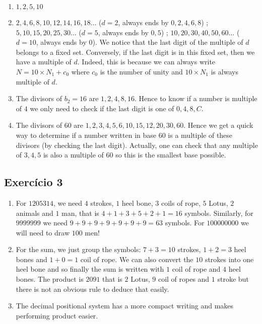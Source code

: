 \begin{enumerate}
\item $1,2,5,10$
\item $2,4,6,8,10,12,14,16,18\ldots$ ($d=2$, always ends by $0,2,4,6,8$) ;
  $5,10,15,20,25,30\ldots$ ($d=5$, always ends by $0,5$) ;
  $10,20,30,40,50,60\ldots$ ($d=10$, always ends by $0$).
  We notice that the last digit of the multiple of $d$ belongs to a fixed set.
  Conversely, if the last digit is in this fixed set, then we have a multiple
  of $d$. Indeed, this is because we can always write
  $N = 10 \times N_1 + c_0$ where $c_0$ is the number of unity and
  $10 \times N_1$ is always multiple of $d$.

\item The divisors of $b_2=16$ are $1,2,4,8,16$. Hence
  to know if a number is multiple of $4$ we only need to check if the
  last digit is one of $0,4,8,C$.
\item The divisors of $60$ are $1,2,3,4,5,6,10,15,12,20,30,60$.
  Hence we get a quick way to determine if a number written in base $60$ is a
  multiple of these divisors (by checking the last digit). Actually, one can
  check that any multiple of $3,4,5$ is also a multiple of $60$ so this is the
  smallest base possible.
\end{enumerate}

\subsection*{Exercício 3}

\begin{enumerate}
\item For $1205314$, we need
  $4$ strokes, $1$ heel bone, $3$ coils of rope, $5$ Lotus,
  $2$ animals and $1$ man, that is $4+1+3+5+2+1=16$ symbols.
  Similarly, for $9999999$ we need $9+9+9+9+9+9+9=63$ symbols.
  For $100000000$ we will need to draw $100$ men!
\item For the sum, we just group the symbols:
  $7+3=10$ strokes, $1+2=3$ heel bones and $1+0=1$ coil of rope. We can
  also convert the $10$ strokes into one heel bone and so finally the sum
  is written with $1$ coil of rope and $4$ heel bones.
  The product is $2091$ that is $2$ Lotus, $9$ coil of ropes and $1$ stroke but
  there is not an obvious rule to deduce that easily.
\item The decimal positional system has a more compact writing and makes
  performing product easier.
\end{enumerate}

